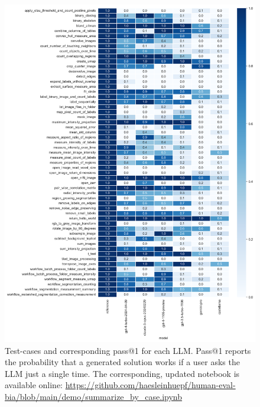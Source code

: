 \documentclass{ecai}
\begin{document}
\begin{figure}[h]
\centering
\includegraphics[width=\textwidth]{performance_per_task.png}
\caption{Test-cases and corresponding pass@1 for each LLM. Pass@1 reports the probability that a generated solution works if a user asks the LLM just a single time. The corresponding, updated notebook is available online:
\url{https://github.com/haesleinhuepf/human-eval-bia/blob/main/demo/summarize_by_case.ipynb}
\newline
\newline
}
\label{fig:performancepertask}
\end{figure}


%
\end{document}
